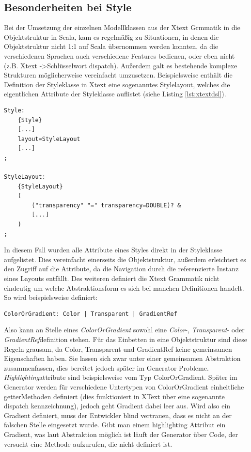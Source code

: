 \subsection{Besonderheiten bei Style}\label{specialstyle}
Bei der Umsetzung der einzelnen Modellklassen aus der Xtext Grmmatik in die Objektstruktur in Scala, kam es regelmäßig zu Situationen, in denen die Objektstruktur nicht 1:1 auf Scala übernommen werden konnten, da die verschiedenen Sprachen auch verschiedene Features bedienen, oder eben nicht (z.B. Xtext -\textgreater Schlüsselwort dispatch). Außerdem galt es bestehende komplexe Strukturen möglicherweise vereinfacht umzusetzen. Beispielsweise enthält die Definition der Styleklasse in Xtext eine sogenanntes Stylelayout, welches die eigentlichen Attribute der Styleklasse auflistet (siehe Listing \ref{lst:xtextdsl}).
\begin{lstlisting}[style=spray, caption={stark vereinfachter Auszug aus der Xtxt Grammatik, die Styles beschreibt}, label = {lst:xtextdsl}]
Style:
    {Style}
    [...]
    layout=StyleLayout
    [...]
;
	
StyleLayout: 
    {StyleLayout}
    (
        ("transparency" "=" transparency=DOUBLE)? &
        [...]
    )
;
\end{lstlisting}
In diesem Fall wurden alle Attribute eines Styles direkt in der Styleklasse aufgelistet. Dies vereinfacht einerseits die Objektstruktur, außerdem erleichtert es den Zugriff auf die Attribute, da die Navigation durch die referenzierte Instanz eines Layouts entfällt. Des weiteren definiert die Xtext Grammatik nicht eindeutig um welche Abstraktionsform es sich bei manchen Definitionen handelt. So wird beispielsweise definiert:
\begin{lstlisting}[style=spray, aboveskip=0pt]
ColorOrGradient: Color | Transparent | GradientRef
\end{lstlisting}
Also kann an Stelle eines \textit{ColorOrGradient} sowohl eine \textit{Color}-, \textit{Transparent}- oder \textit{GradientRef}definition stehen. Für das Einbetten in eine Objektstruktur sind diese Regeln grausam, da Color, Transparent und GradientRef keine gemeinsamen Eigenschaften haben. Sie lassen sich zwar unter einer gemeinsamen Abstraktion zusammenfassen, dies bereitet jedoch später im Generator Probleme. \textit{Highlighting}attribute sind beispielsweise vom Typ ColorOrGradient. Später im Generator werden für verschiedene Untertypen von ColorOrGradient einheitliche getterMethoden definiert (dies funktioniert in XText über eine sogenannte dispatch kennzeichnung), jedoch geht Gradient dabei leer aus. Wird also ein Gradient definiert, muss der Entwickler blind vertrauen, dass es nicht an der falschen Stelle eingesetzt wurde. Gibt man einem highlighting Attribut ein Gradient, was laut Abstraktion möglich ist läuft der Generator über Code, der versucht eine Methode aufzurufen, die nicht definiert ist.
